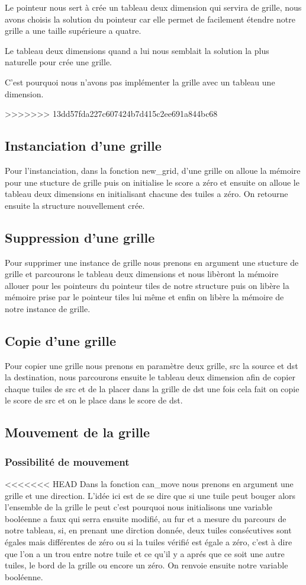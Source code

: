 \documentclass{article}
\begin{document}
Le pointeur nous sert à crée un tableau deux dimension qui servira de grille, nous avons choisis la solution du pointeur car elle permet de facilement étendre notre grille a une taille supérieure a quatre.

Le tableau deux dimensions quand a lui nous semblait la solution la plus naturelle pour crée une grille.

C'est pourquoi nous n'avons pas implémenter la grille avec un tableau une dimension.

>>>>>>> 13dd57fda227c607424b7d415c2ee691a844bc68
\subsection{Instanciation d'une grille}
Pour l'instanciation, dans la fonction new\_grid, d'une grille on alloue la mémoire pour une stucture de grille puis on initialise le score a zéro et ensuite on alloue le tableau deux dimensions en initialisant chacune des tuiles a zéro. On retourne ensuite la structure nouvellement crée.
\subsection{Suppression d'une grille}
Pour supprimer une instance de grille nous prenons en argument une stucture de grille et parcourons le tableau deux dimensions et nous libèront la mémoire allouer pour les pointeurs du pointeur tiles de notre structure puis on libère la mémoire prise par le pointeur tiles lui même et enfin on libère la mémoire de notre instance de grille.
\subsection{Copie d'une grille}
Pour copier une grille nous prenons en paramètre deux grille, src la source et dst la destination, nous parcourons ensuite le tableau deux dimension afin de copier chaque tuiles de src et de la placer dans la grille de dst une fois cela fait on copie le score de src et on le place dans le score de dst.
\subsection{Mouvement de la grille}
\subsubsection{Possibilité de mouvement}
<<<<<<< HEAD
Dans la fonction can\_move nous prenons en argument une grille et une direction. L'idée ici est de se dire que si une tuile peut bouger alors l'ensemble de la grille le peut c'est pourquoi nous initialisons une variable booléenne a faux qui serra ensuite modifié, au fur et a mesure du parcours de notre tableau, si, en prenant une dirction donnée, deux tuiles consécutives sont égales mais différentes de zéro ou si la tuiles vérifié est égale a zéro, c'est à dire que l'on a un trou entre notre tuile et ce qu'il y a aprés que ce soit une autre tuiles, le bord de la grille ou encore un zéro. On renvoie ensuite notre variable booléenne.
\end{document}
